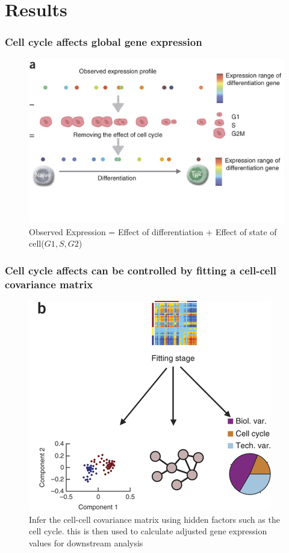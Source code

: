 \documentclass[10pt, compress]{beamer}
\renewcommand{\(}{\begin{columns}}
\renewcommand{\)}{\end{columns}}
\newcommand{\<}[1]{\begin{column}{#1}}
\renewcommand{\>}{\end{column}}
\begin{document}
\section{Results}
\begin{frame}
\frametitle{Cell cycle affects global gene expression}
\begin{figure}
\includegraphics[width=0.8\linewidth]{images/expression.jpg}
\caption{Observed Expression = Effect of differentiation + Effect of state of cell($G1,  S , G2$)}
\end{figure}
\end{frame}

\begin{frame}
\frametitle{Cell cycle affects can be controlled by fitting a cell-cell covariance matrix}
\begin{figure}
\includegraphics[width=0.7\linewidth]{images/fitting.jpg}
\caption{Infer the cell-cell covariance matrix using hidden factors such as the cell cycle. this is then used to calculate adjusted
gene expression values for downstream analysis}
\end{figure}
\end{frame}
\end{document}
